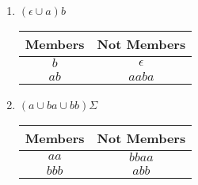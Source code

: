 \begin{enumerate}
\begin{enumerate}
              \item $ (\epsilon  \cup a)b $
                    \begin{table}[H]
                        \centering
                        \begin{tabular}{|c|c|}
                            \hline
                            Members & Not Members \\
                            \hline
                            $b$     & $\epsilon$  \\
                            $ab$    & $aaba$      \\
                            \hline
                        \end{tabular}
                    \end{table}
              \item $(a\cup ba \cup bb)\Sigma$
                    \begin{table}[H]
                        \centering
                        \begin{tabular}{|c|c|}
                            \hline
                            Members & Not Members \\
                            \hline
                            $aa$    & $bbaa$      \\
                            $bbb$   & $abb$       \\
                            \hline
                        \end{tabular}
                    \end{table}
          \end{enumerate}
\end{enumerate}
